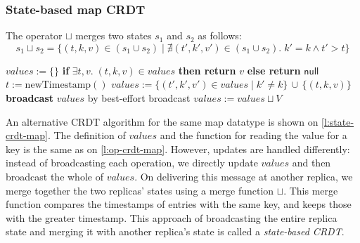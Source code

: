 \begin{frame}
    \label{s:state-crdt-map}
    \frametitle{State-based map CRDT}
    \footnotesize
    The operator $\sqcup$ merges two states $s_1$ and $s_2$ as follows:
    \[ s_1 \sqcup s_2 = \{(t,k,v) \in (s_1 \cup s_2) \mid \nexists (t',k',v') \in (s_1 \cup s_2).\; k' = k \wedge t' > t\} \]
    \begin{algorithmic}
            \State $\mathit{values} := \{\}$
        \EndOn
        \State
            \State \textbf{if} $\exists t,v.\; (t,k,v) \in \mathit{values}$ \textbf{then return} $v$ \textbf{else return} $\mathsf{null}$
        \EndOn
        \State
            \State $t := \mathrm{newTimestamp}()$ 
            \State $\mathit{values} := \{(t',k',v') \in \mathit{values} \mid k' \neq k\} \,\cup\, \{(t,k,v)\}$
            \State \textbf{broadcast} $\mathit{values}$ by best-effort broadcast
        \EndOn
        \State
            \State $\mathit{values} := \mathit{values} \sqcup V$
        \EndOn
    \end{algorithmic}
\end{frame}
\label{l:state-crdt-map}

An alternative CRDT algorithm for the same map datatype is shown on \autoref{l:state-crdt-map}.
The definition of $\mathit{values}$ and the function for reading the value for a key is the same as on \autoref{l:op-crdt-map}.
However, updates are handled differently: instead of broadcasting each operation, we directly update $\mathit{values}$ and then broadcast the whole of $\mathit{values}$.
On delivering this message at another replica, we merge together the two replicas' states using a merge function $\sqcup$.
This merge function compares the timestamps of entries with the same key, and keeps those with the greater timestamp.
This approach of broadcasting the entire replica state and merging it with another replica's state is called a \emph{state-based CRDT}.

